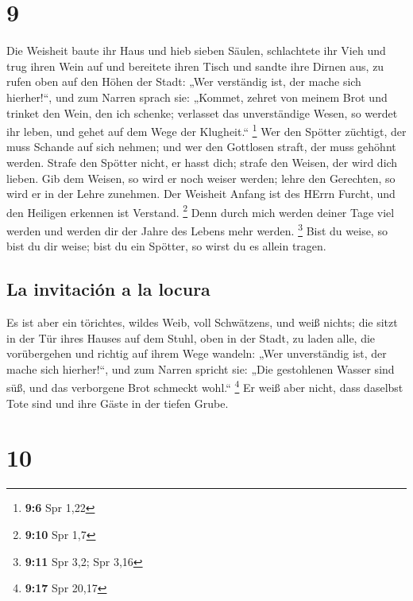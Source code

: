 \hypertarget{section-8}{%
\section{9}\label{section-8}}

 Die Weisheit baute ihr Haus und hieb sieben Säulen,
 schlachtete ihr Vieh und trug ihren Wein auf und
bereitete ihren Tisch  und sandte ihre Dirnen aus, zu
rufen oben auf den Höhen der Stadt:  „Wer verständig ist,
der mache sich hierher!{}``, und zum Narren sprach sie: 
„Kommet, zehret von meinem Brot und trinket den Wein, den ich schenke;
 verlasset das unverständige Wesen, so werdet ihr leben,
und gehet auf dem Wege der Klugheit.`` \footnote{\textbf{9:6} Spr 1,22}
 Wer den Spötter züchtigt, der muss Schande auf sich
nehmen; und wer den Gottlosen straft, der muss gehöhnt werden.
 Strafe den Spötter nicht, er hasst dich; strafe den
Weisen, der wird dich lieben.  Gib dem Weisen, so wird er
noch weiser werden; lehre den Gerechten, so wird er in der Lehre
zunehmen.  Der Weisheit Anfang ist des HErrn Furcht, und
den Heiligen erkennen ist Verstand. \footnote{\textbf{9:10} Spr 1,7}
 Denn durch mich werden deiner Tage viel werden und
werden dir der Jahre des Lebens mehr werden. \footnote{\textbf{9:11} Spr
  3,2; Spr 3,16}  Bist du weise, so bist du dir weise;
bist du ein Spötter, so wirst du es allein tragen.

\hypertarget{la-invitaciuxf3n-a-la-locura}{%
\subsection{La invitación a la
locura}\label{la-invitaciuxf3n-a-la-locura}}

 Es ist aber ein törichtes, wildes Weib, voll Schwätzens,
und weiß nichts;  die sitzt in der Tür ihres Hauses auf
dem Stuhl, oben in der Stadt,  zu laden alle, die
vorübergehen und richtig auf ihrem Wege wandeln:  „Wer
unverständig ist, der mache sich hierher!{}``, und zum Narren spricht
sie:  „Die gestohlenen Wasser sind süß, und das
verborgene Brot schmeckt wohl.`` \footnote{\textbf{9:17} Spr 20,17}
 Er weiß aber nicht, dass daselbst Tote sind und ihre
Gäste in der tiefen Grube.

\hypertarget{section-9}{%
\section{10}\label{section-9}}

